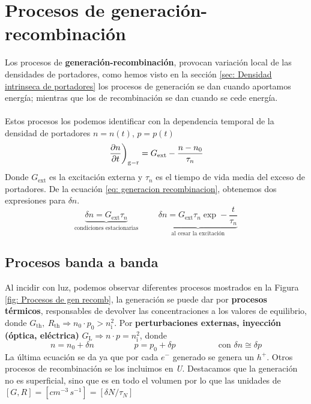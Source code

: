 \section{Procesos de generación-recombinación} \label{sec: procesos de generacion-recombinacion}
Los procesos de \textbf{generación-recombinación}, provocan variación local de las densidades de portadores, como hemos visto en la sección \ref{sec: Densidad intrinseca de portadores} los procesos de generación se dan cuando aportamos energía; mientras que los de recombinación se dan cuando se cede energía.\\\\
Estos procesos los podemos identificar con la dependencia temporal de la densidad de portadores $n=n(t)$, $p=p(t)$
\begin{equation}
    \left. \pdiff[]{n}{t} \right)_{\mathrm{g-r}}=G_\mathrm{ext}-\frac{n-n_0}{\tau_n}
    \label{eq: generacion recombinacion}
\end{equation}
Donde $G_\mathrm{ext}$ es la excitación externa y $\tau_n$ es el tiempo de vida media del exceso de portadores. De la ecuación \ref{eq: generacion recombinacion}, obtenemos dos expresiones para $\delta n$.
\begin{equation}
    \underbrace{\delta n =G_\mathrm{ext}\tau_n}_{\text{condiciones estacionarias}} \hspace{1cm} \underbrace{\delta n=G_\mathrm{ext} \tau_n \exp - \frac{t}{\tau_n}}_{\text{al cesar la excitación}}
\end{equation}
\newpage
\subsection{Procesos banda a banda} \label{sec: Procesos banda a banda}
Al incidir con luz, podemos observar diferentes procesos mostrados en la Figura \ref{fig: Procesos de gen recomb}, la generación se puede dar por \textbf{procesos térmicos}, responsables de devolver las concentraciones a los valores de equilibrio, donde $G_\mathrm{th}, \ R_\mathrm{th} \Rightarrow n_0\cdot p_0>n_\mathrm{i}^2$. Por \textbf{perturbaciones externas, inyección (óptica, eléctrica)} $G_\mathrm{L} \Rightarrow n\cdot p = n_\mathrm{i}^2$, donde $$n=n_0+\delta n \hspace{2cm} p=p_0+\delta p \hspace{2cm} 
\text{   con } \delta n \cong \delta p $$
La última ecuación se da ya que por cada $e^-$ generado se genera un $h^+$. Otros procesos de recombinación se los incluimos en \textit{U}.
Destacamos que la generación no es superficial, sino que es en todo el volumen por lo que las unidades de $[G,R]=\unit{[cm^{-3} \, s^{-1}]}=[\delta N/\tau_N]$

